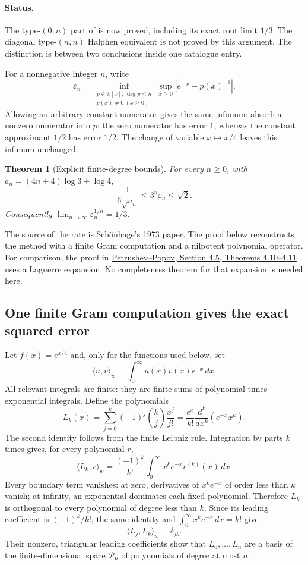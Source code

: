 \documentclass[11pt]{article}
\newcommand{\R}{\mathbb R}
\newcommand{\code}[1]{\ifmmode\text{\small\nolinkurl{#1}}\else{\small\nolinkurl{#1}}\fi}
\newtheorem{theorem}{Theorem}[section]
\theoremstyle{remark}
\numberwithin{equation}{section}
\begin{document}
\paragraph{Status.}
The type-$(0,n)$ part of \code{exp-rational-halfline} is now proved,
including its exact root limit $1/3$.  The diagonal type-$(n,n)$
Halphen equivalent is not proved by this argument.  The distinction is
between two conclusions inside one catalogue entry.

For a nonnegative integer $n$, write
\[
 \varepsilon_n=\inf_{\substack{p\in\R[x],\ \deg p\le n\\
                   p(x)\ne0\ (x\ge0)}}
       \sup_{x\ge0}|e^{-x}-p(x)^{-1}|.
\]
Allowing an arbitrary constant numerator gives the same infimum:
absorb a nonzero numerator into $p$; the zero numerator has error $1$,
whereas the constant approximant $1/2$ has error $1/2$.
The change of variable $x\mapsto x/4$ leaves this infimum unchanged.

\begin{theorem}[Explicit finite-degree bounds]
For every $n\ge0$, with $a_n=(4n+4)\log3+\log4$,
\begin{equation}\label{polyretry:reciprocal-sharp}
 \frac{1}{6\sqrt{a_n}}\le 3^n\varepsilon_n\le\sqrt2.
\end{equation}
Consequently $\lim_{n\to\infty}\varepsilon_n^{1/n}=1/3$.
\end{theorem}

The source of the rate is Sch\"onhage's
\href{https://doi.org/10.1016/0021-9045(73)90042-7}{1973 paper}.
The proof below reconstructs the method with a finite Gram computation
and a nilpotent polynomial operator.  For comparison, the proof in
\href{https://people.math.ethz.ch/~hiptmair/Seminars/RAP_22/PEP87.pdf}{
Petrushev--Popov, Section 4.5, Theorems 4.10--4.11}
uses a Laguerre expansion.  No completeness theorem for that expansion
is needed here.

\subsection{One finite Gram computation gives the exact squared error}
Let $f(x)=e^{x/4}$ and, only for the functions used below, set
\[
 \langle u,v\rangle_w=\int_0^\infty u(x)v(x)e^{-x}\,dx.
\]
All relevant integrals are finite: they are finite sums of polynomial
times exponential integrals.  Define the polynomials
\[
 L_k(x)=\sum_{j=0}^k(-1)^j\binom{k}{j}\frac{x^j}{j!}
       =\frac{e^x}{k!}\frac{d^k}{dx^k}(e^{-x}x^k).
\]
The second identity follows from the finite Leibniz rule.
Integration by parts $k$ times gives, for every polynomial $r$,
\[
 \langle L_k,r\rangle_w
 =\frac{(-1)^k}{k!}\int_0^\infty x^ke^{-x}r^{(k)}(x)\,dx.
\]
Every boundary term vanishes: at zero, derivatives of $x^ke^{-x}$
of order less than $k$ vanish; at infinity, an exponential dominates
each fixed polynomial.  Therefore $L_k$ is orthogonal to every
polynomial of degree less than $k$.  Since its leading coefficient is
$(-1)^k/k!$, the same identity and
$\int_0^\infty x^ke^{-x}\,dx=k!$ give
\[
 \langle L_j,L_k\rangle_w=\delta_{jk}.
\]
Their nonzero, triangular leading coefficients show that
$L_0,\ldots,L_n$ are a basis of the finite-dimensional space
$\mathcal P_n$ of polynomials of degree at most $n$.
\end{document}
